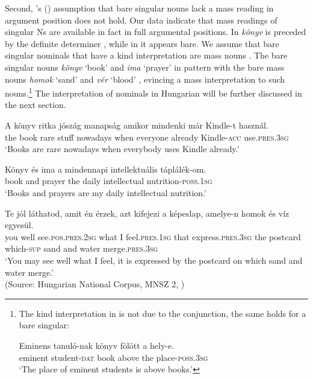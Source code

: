 \documentclass[output=paper]{langscibook}
\begin{document}
\noindent Second, \citeauthor{erbach-etal-19}’s (\citeyear{erbach-etal-19}) assumption that bare singular nouns lack a mass reading in argument position does not hold. Our data indicate that mass readings of singular Ns are available in fact in full argumental positions. In  \textit{könyv} is preceded by the definite determiner , while in  it appears bare. We assume that bare singular nominals that have a kind interpretation are mass nouns \citep{chierchia-98b}. The bare singular nouns \textit{könyv} `book' and \textit{ima} `prayer' in  pattern with the bare mass nouns \textit{homok} `sand' and \textit{vér} `blood' , evincing a mass interpretation to such nouns.\footnote{The kind interpretation in  is not due to the conjunction, the same holds for a bare singular: 

\ea
\gll Eminens tanuló-nak könyv fölött a hely-e. \\
eminent student-\textsc{dat} book above the place-\textsc{poss}.\textsc{3sg} \\
\glt `The place of eminent students is above books.'
\z
} The interpretation of nominals in Hungarian will be further discussed in the next section.


\ea \label{schv-nem:ex:34}
\gll A könyv ritka jószág manapság amikor mindenki már Kindle-t használ. \\  
 the book rare stuff nowadays when everyone already Kindle-\textsc{acc} use.\textsc{pres}.\textsc{3sg}\\ 
\glt `Books are rare  nowadays when everybody uses Kindle already.'
\z

\ea \label{schv-nem:ex:35}
\gll Könyv és ima a mindennapi intellektuális táplálék-om.%
\\  
book   and  prayer  the daily      intellectual    nutrition-\textsc{poss}.\textsc{1sg}\\ 
\glt `Books and prayers are my daily intellectual nutrition.'
\z


\ea \label{schv-nem:ex:36}
\gll Te jól láthatod, amit én érzek, azt kifejezi a képeslap, amelye-n homok és víz egyesül.\\  
 you well see.\textsc{pos}.\textsc{pres}.\textsc{2sg}  what I feel.\textsc{pres}.\textsc{1sg} that express.\textsc{pres}.\textsc{3sg} the postcard which-\textsc{sup} sand and water merge.\textsc{pres}.\textsc{3sg}\\ 
\glt `You may see well what I feel, it is expressed by the postcard on which sand and water merge.' \\\hfill (Source: Hungarian National Corpus, MNSZ 2, \citealt{oravecz-14})
\z
\end{document}

